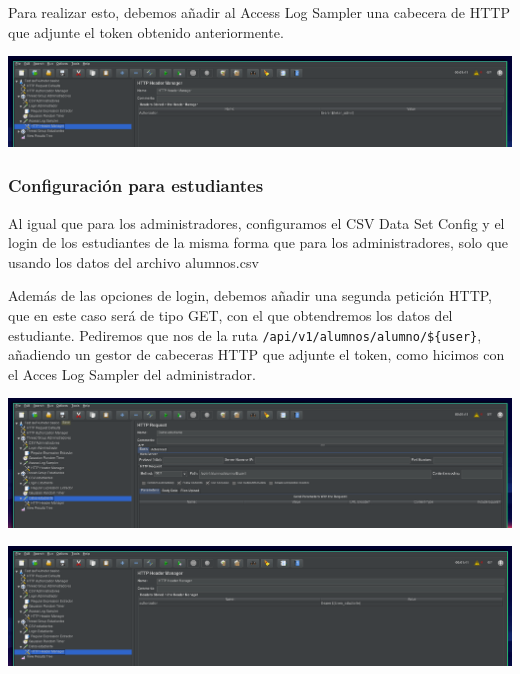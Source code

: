 \documentclass[12pt, spanish]{article}
\begin{document}
Para realizar esto, debemos añadir al Access Log Sampler una cabecera de HTTP que adjunte el token obtenido anteriormente.

\begin{center}
\includegraphics[scale=0.25]{jmeter-7.png}
\end{center}

\subsubsection{Configuración para estudiantes}

Al igual que para los administradores, configuramos el CSV Data Set Config y el login de los estudiantes de la misma forma que para los administradores, solo que usando los datos del archivo alumnos.csv

Además de las opciones de login, debemos añadir una segunda petición HTTP, que en este caso será de tipo GET, con el que obtendremos los datos del estudiante. Pediremos que nos de la ruta \texttt{/api/v1/alumnos/alumno/\$\{user\}}, añadiendo un gestor de cabeceras HTTP que adjunte el token, como hicimos con el Acces Log Sampler del administrador.

\begin{center}
\includegraphics[scale=0.25]{jmeter-8.png}
\end{center}


\begin{center}
\includegraphics[scale=0.25]{jmeter-9.png}
\end{center}
\end{document}
